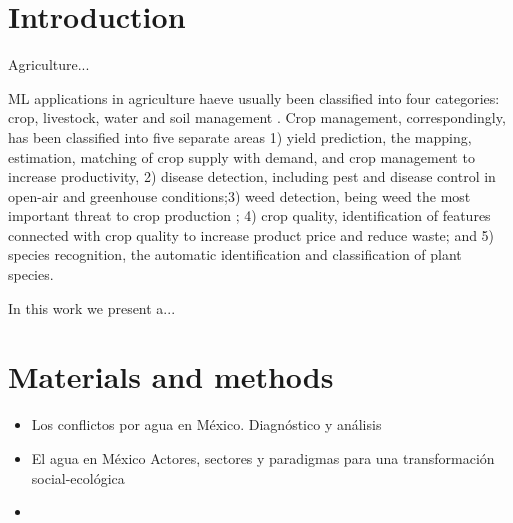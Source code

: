\documentclass{svproc}
\begin{document}
\begin{abstract}

\keywords{}
\end{abstract}
%
\section{Introduction}\label{Sec:Intro}
Agriculture...

ML applications in agriculture haeve usually been classified into four categories: crop, livestock, water and soil management \cite{Liakos2018}. Crop management, correspondingly, has been classified into five separate areas 1) yield prediction, the mapping, estimation, matching of crop supply with demand, and crop management to increase productivity, 2) disease detection, including pest and disease control in open-air and greenhouse conditions;3) weed detection, being weed the most important threat to crop production \cite{Liakos2018}; 4) crop quality, identification of features connected with crop quality to increase product price and reduce waste; and 5) species recognition, the automatic identification and classification of plant species.  

In this work we present a...



\section{Materials and methods}\label{Sec:Metodologia}


\begin{itemize}
    \item Los conflictos por agua en México. Diagnóstico y análisis \cite{Perez2006}  %
    \item El agua en México Actores, sectores y paradigmas para una transformación social-ecológica \cite{LopezMorales2017} %
    \item 
\end{itemize}
\end{document}
